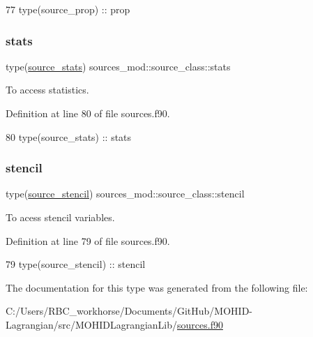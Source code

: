 \begin{DoxyCode}
77         \textcolor{keywordtype}{type}(source\_prop)  :: prop
\end{DoxyCode}
\mbox{\label{structsources__mod_1_1source__class_a2ed110f187434e6b6345f21822993517}} 
\subsubsection{\texorpdfstring{stats}{stats}}
{\footnotesize\ttfamily type(\mbox{\hyperlink{structsources__mod_1_1source__stats}{source\+\_\+stats}}) sources\+\_\+mod\+::source\+\_\+class\+::stats\hspace{0.3cm}{\ttfamily [private]}}



To access statistics. 



Definition at line 80 of file sources.\+f90.


\begin{DoxyCode}
80         \textcolor{keywordtype}{type}(source\_stats) :: stats
\end{DoxyCode}
\mbox{\label{structsources__mod_1_1source__class_a7950d4033c4b4be466479fc8a11dad1c}} 
\subsubsection{\texorpdfstring{stencil}{stencil}}
{\footnotesize\ttfamily type(\mbox{\hyperlink{structsources__mod_1_1source__stencil}{source\+\_\+stencil}}) sources\+\_\+mod\+::source\+\_\+class\+::stencil\hspace{0.3cm}{\ttfamily [private]}}



To acess stencil variables. 



Definition at line 79 of file sources.\+f90.


\begin{DoxyCode}
79         \textcolor{keywordtype}{type}(source\_stencil) :: stencil
\end{DoxyCode}


The documentation for this type was generated from the following file\+:\begin{DoxyCompactItemize}
\item 
C\+:/\+Users/\+R\+B\+C\+\_\+workhorse/\+Documents/\+Git\+Hub/\+M\+O\+H\+I\+D-\/\+Lagrangian/src/\+M\+O\+H\+I\+D\+Lagrangian\+Lib/\mbox{\hyperlink{sources_8f90}{sources.\+f90}}\end{DoxyCompactItemize}
